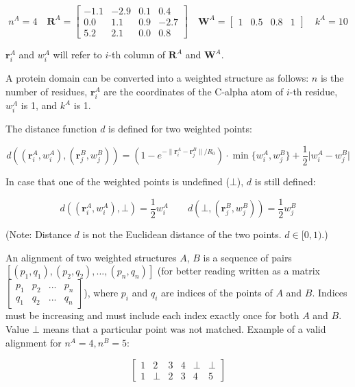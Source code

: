 \documentclass{article}
\begin{document}
\[
  n^A = 4 \quad
  \mathbf{R}^A = \begin{bmatrix}-1.1&-2.9&0.1&0.4\\0.0&1.1&0.9&-2.7\\5.2&2.1&0.0&0.8\end{bmatrix} \quad
  \mathbf{W}^A = \begin{bmatrix}1&0.5&0.8&1\end{bmatrix} \quad
  k^A = 10
\]

\(\mathbf{r}^A_i\) and \(w^A_i\) will refer to \(i\)-th column of
\(\mathbf{R}^A\) and \(\mathbf{W}^A\).


A protein domain can be converted into a weighted structure as follows:
\(n\) is the number of residues, \(\mathbf{r}^A_i\) are the coordinates of the
C-alpha atom of \(i\)-th residue, \(w^A_i\) is 1, and \(k^A\) is 1.

The distance function \(d\) is defined for two weighted points:

\[
  d \left( (\mathbf{r}^A_i, w^A_i), (\mathbf{r}^B_j, w^B_j) \right) 
  = \left( 1 - e^{-\lVert \mathbf{r}^A_i-\mathbf{r}^B_j \rVert / R_0} \right) \cdot \min\{ w^A_i, w^B_j \} + \frac{1}{2} \lvert w^A_i-w^B_j \rvert
\]

In case that one of the weighted points is undefined (\(\bot\)), \(d\)
is still defined:

\[
  d \left( (\mathbf{r}^A_i, w^A_i), \bot \right) = \frac{1}{2} w^A_i \qquad 
  d \left( \bot, (\mathbf{r}^B_j, w^B_j) \right) = \frac{1}{2} w^B_j
\]

(Note: Distance \(d\) is not the Euclidean distance of the two points.
\(d \in [0,1)\).)

An alignment of two weighted structures \(A\), \(B\) is a sequence of
pairs \([(p_1, q_1), (p_2, q_2), ..., (p_n, q_n)]\) (for better reading
written as a matrix
\(\begin{bmatrix}p_1&p_2&...&p_n\\q_1&q_2&...&q_n\end{bmatrix}\)), where
\(p_i\) and \(q_i\) are indices of the points of \(A\) and \(B\).
Indices must be increasing and must include each index exactly once for
both \(A\) and \(B\). Value \(\bot\) means that a particular point was
not matched. Example of a valid alignment for \(n^A = 4, n^B = 5\):

\[\begin{bmatrix}1&2&3&4&\bot&\bot\\1&\bot&2&3&4&5\end{bmatrix}\]
\end{document}
